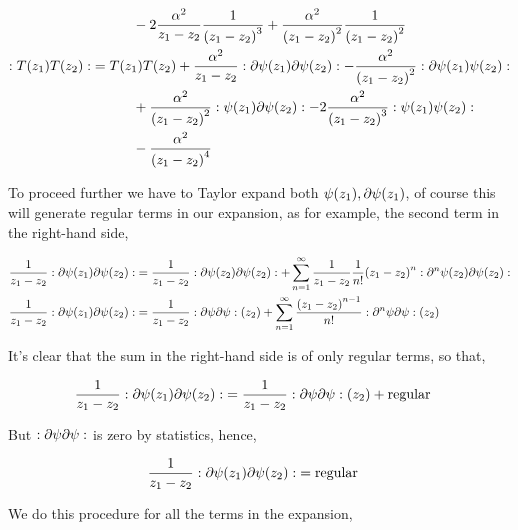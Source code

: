 \begin{align*}
    &\quad\quad\quad-2\frac{\alpha^2}{z_1-z_2}\frac{1}{\qty(z_1-z_2)^3}+\frac{\alpha^2}{\qty(z_1-z_2)^2}\frac{1}{\qty(z_1-z_2)^2}\\
    :T\qty(z_1) T\qty(z_2):&={ T\qty(z_1)T\qty(z_2)}+\frac{\alpha^2}{z_1-z_2}:\partial\psi\qty(z_1)\partial\psi\qty(z_2):-\frac{\alpha^2}{\qty(z_1-z_2)^2}:\partial\psi\qty(z_1)\psi\qty(z_2):\\
    &\quad\quad\quad+\frac{\alpha^2}{\qty(z_1-z_2)^2}:{\psi}\qty(z_1)\partial{\psi}\qty(z_2):-2\frac{\alpha^2}{\qty(z_1-z_2)^3}:{\psi}\qty(z_1){\psi}\qty(z_2):\\
    &\quad\quad\quad-\frac{\alpha^2}{\qty(z_1-z_2)^4}
\end{align*}

To proceed further we have to Taylor expand both $\psi\qty(z_1),\partial\psi\qty(z_1)$, of course this will generate regular terms in our expansion, as for example, the second term in the right-hand side,

\begin{align*}
    \frac{1}{z_1-z_2}:\partial\psi\qty(z_1)\partial\psi\qty(z_2):&=\frac{1}{z_1-z_2}:\partial\psi\qty(z_2)\partial\psi\qty(z_2):+\sum\limits_{n=1}^\infty\frac{1}{z_1-z_2}\frac{1}{n!}\qty(z_1-z_2)^n:\partial^n\psi\qty(z_2)\partial\psi\qty(z_2):\\
    \frac{1}{z_1-z_2}:\partial\psi\qty(z_1)\partial\psi\qty(z_2):&=\frac{1}{z_1-z_2}:\partial\psi\partial\psi:\qty(z_2)+\sum\limits_{n=1}^\infty\frac{\qty(z_1-z_2)^{n-1}}{n!}:\partial^n\psi\partial\psi:\qty(z_2)
\end{align*}

It's clear that the sum in the right-hand side is of only regular terms, so that,

\begin{align*}
    \frac{1}{z_1-z_2}:\partial\psi\qty(z_1)\partial\psi\qty(z_2):&=\frac{1}{z_1-z_2}:\partial\psi\partial\psi:\qty(z_2)+\textnormal{regular}
\end{align*}

But $:\partial\psi\partial\psi:$ is zero by statistics, hence, 

\begin{align*}
    \frac{1}{z_1-z_2}:\partial\psi\qty(z_1)\partial\psi\qty(z_2):&=\textnormal{regular}
\end{align*}

We do this procedure for all the terms in the expansion,

